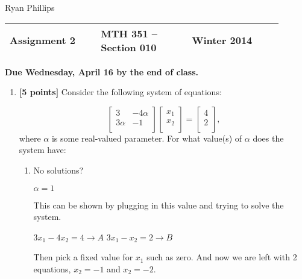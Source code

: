 \documentclass{article}
\newcommand{\myspace}{0.4cm}
\begin{document}
\large
Ryan Phillips

\begin{center}

\large
\begin{tabular}{L{0.3\linewidth} C{0.3\linewidth} R{0.3\linewidth}}
\hline
Assignment 2	&MTH 351 -- Section 010		&Winter 2014 \\
\hline
\end{tabular}

\vspace{\myspace}

{\bf Due Wednesday, April 16 by the end of class.}
\end{center}

\begin{enumerate}

\item {\bf [5 points]} Consider the following system of equations:

\begin{equation*}
\begin{bmatrix}
3		&-4\alpha \\
3\alpha	&-1\\
\end{bmatrix}  \begin{bmatrix}x_1 \\ x_2 \\ \end{bmatrix}= \begin{bmatrix}4 \\ 2 \\ \end{bmatrix},
\end{equation*}
where $\alpha$ is some real-valued parameter. For what value(s) of $\alpha$ does the system have:
\begin{enumerate} 
\item No solutions? \newline

\begin{mdframed}[style=MyFrame]

$\alpha = 1$ 

This can be shown by plugging in this value and trying to solve the system.

$3x_1 - 4x_2 = 4 \rightarrow A $ \newline
$3x_1 - x_2 = 2 \rightarrow B$

Then pick a fixed value for $x_1$ such as zero. And now we are left with 2 equations, $x_2 = -1$ and $x_2 = -2$. 


\end{mdframed}
\end{enumerate}
\end{enumerate}
\end{document}
